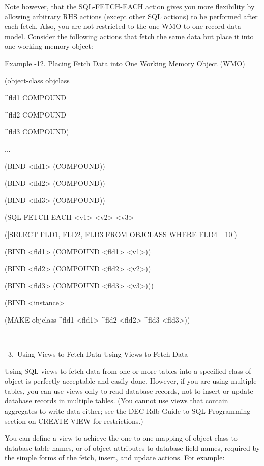           Note however, that the SQL-FETCH-EACH
          action gives you more flexibility by
          allowing arbitrary RHS actions (except
          other SQL actions) to be performed after
          each fetch. Also, you are not restricted
          to the one-WMO-to-one-record data model.
          Consider the following actions that fetch
          the same data but place it into one
          working memory object:

          Example -12. Placing Fetch Data into One
          Working Memory Object (WMO)

          (object-class objclass

          ^fld1 COMPOUND

          ^fld2 COMPOUND

          ^fld3 COMPOUND)

          ...

          (BIND <fld1> (COMPOUND))

          (BIND <fld2> (COMPOUND))

          (BIND <fld3> (COMPOUND))

          (SQL-FETCH-EACH <v1> <v2> <v3>

          (|SELECT FLD1, FLD2, FLD3 FROM OBJCLASS
          WHERE FLD4 =10|)

          (BIND <fld1> (COMPOUND <fld1> <v1>))

          (BIND <fld2> (COMPOUND <fld2> <v2>))

          (BIND <fld3> (COMPOUND <fld3> <v3>)))

          (BIND <instance>

          (MAKE objclass ^fld1 <fld1> ^fld2 <fld2>
          ^fld3 <fld3>))

           

       3. Using Views to Fetch Data Using Views to
          Fetch Data

     Using SQL views to fetch data from one or more
     tables into a specified class of object is
     perfectly acceptable and easily done. However,
     if you are using multiple tables, you can use
     views only to read database records, not to
     insert or update database records in multiple
     tables. (You cannot use views that contain
     aggregates to write data either; see the DEC
     Rdb Guide to SQL Programming section on CREATE
     VIEW for restrictions.)

     You can define a view to achieve the
     one-to-one mapping of object class to database
     table names, or of object attributes to
     database field names, required by the simple
     forms of the fetch, insert, and update
     actions. For example:

